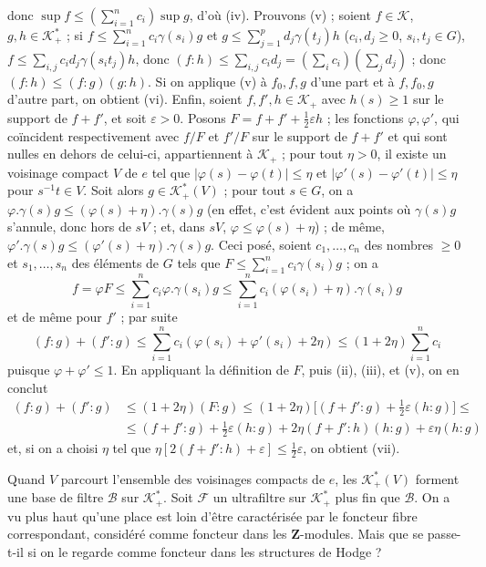 donc $\sup f\le(\sum_{i=1}^n c_i)\sup g$, d’où (iv).
Prouvons (v) ; soient $f\in\mathcal K$, $g,h\in\mathcal K_+^*$ ;
si $f\le\sum_{i=1}^n c_i\gamma(s_i)g$ et
$g\le\sum_{j=1}^p d_j\gamma(t_j)h$ ($c_i,d_j\ge0$, $s_i,t_j\in G$),
$f\le\sum_{i,j}c_i d_j\gamma(s_i t_j)h$, donc
$(f:h)\le\sum_{i,j}c_i d_j=(\sum_i c_i)(\sum_j d_j)$ ;
donc $(f:h)\le(f:g)(g:h)$.
Si on applique (v) à $f_0,f,g$ d’une part et à $f,f_0,g$ d’autre part,
on obtient (vi). Enfin, soient $f,f',h\in\mathcal K_+$ avec $h(s)\ge1$
sur le support de $f+f'$, et soit $\varepsilon>0$.
Posons $F=f+f'+\frac12\varepsilon h$ ; les fonctions $\varphi,\varphi'$,
qui coïncident respectivement avec $f/F$ et $f'/F$ sur le support de $f+f'$
et qui sont nulles en dehors de celui-ci, appartiennent à $\mathcal K_+$ ;
pour tout $\eta>0$, il existe un voisinage compact $V$ de $e$ tel que
$|\varphi(s)-\varphi(t)|\le\eta$ et $|\varphi'(s)-\varphi'(t)|\le\eta$
pour $s^{-1}t\in V$. Soit alors $g\in\mathcal K_+^*(V)$ ; pour tout $s\in G$,
on a $\varphi.\gamma(s)g\le(\varphi(s)+\eta).\gamma(s)g$
(en effet, c’est évident aux points où $\gamma(s)g$ s’annule, donc hors de $sV$ ;
et, dans $sV$, $\varphi\le\varphi(s)+\eta$) ; de même,
$\varphi'.\gamma(s)g\le(\varphi'(s)+\eta).\gamma(s)g$.
Ceci posé, soient $c_1,\ldots,c_n$ des nombres $\ge0$ et
$s_1,\ldots,s_n$ des éléments de $G$ tels que
$F\le\sum_{i=1}^n c_i\gamma(s_i)g$ ; on a
\[
f=\varphi F\le\sum_{i=1}^n c_i\varphi.\gamma(s_i)g
\le\sum_{i=1}^n c_i(\varphi(s_i)+\eta).\gamma(s_i)g
\]
et de même pour $f'$ ; par suite
\[
(f:g)+(f':g)\le\sum_{i=1}^n c_i(\varphi(s_i)+\varphi'(s_i)+2\eta)
\le(1+2\eta)\sum_{i=1}^n c_i
\]
puisque $\varphi+\varphi'\le1$. En appliquant la définition de $F$,
puis (ii), (iii), et (v), on en conclut
\[
\begin{aligned}
(f:g)+(f':g)&\le(1+2\eta)(F:g)
\le(1+2\eta)\bigl[(f+f':g)+\tfrac12\varepsilon(h:g)\bigr]\le{}\\
&\le(f+f':g)+\tfrac12\varepsilon(h:g)
+2\eta(f+f':h)(h:g)+\varepsilon\eta(h:g)
\end{aligned}
\]
et, si on a choisi $\eta$ tel que
$\eta[2(f+f':h)+\varepsilon]\le\frac12\varepsilon$, on obtient (vii).

Quand $V$ parcourt l’ensemble des voisinages compacts de $e$, les
$\mathcal K_+^*(V)$ forment une base de filtre $\mathcal B$ sur $\mathcal K_+^*$.
Soit $\mathcal F$ un ultrafiltre sur $\mathcal K_+^*$ plus fin que $\mathcal B$.
On a vu plus haut qu’une place est  loin d’être caractérisée par le
foncteur fibre correspondant, 
considéré comme foncteur dans les $\mathbf Z$-modules.
Mais que se passe-t-il si on le regarde comme foncteur dans les structures de Hodge ?

